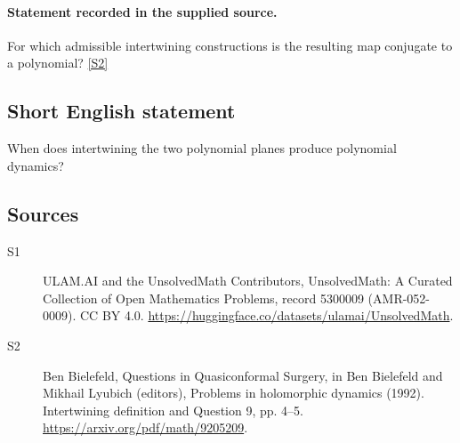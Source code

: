 \documentclass[11pt]{article}
\newcommand{\sref}[2]{\hyperlink{source:#1:#2}{[S#2]}}
\begin{document}
\paragraph{Statement recorded in the supplied source.}
For which admissible intertwining constructions is the resulting map conjugate to a polynomial? \sref{5300009}{2}
\subsection{Short English statement}
When does intertwining the two polynomial planes produce polynomial dynamics?
\subsection{Sources}
\begin{description}
\item[\hypertarget{source:5300009:1}{S1}] ULAM.AI and the UnsolvedMath Contributors, UnsolvedMath: A Curated Collection of Open Mathematics Problems, record 5300009 (AMR-052-0009). CC BY 4.0. \url{https://huggingface.co/datasets/ulamai/UnsolvedMath}.
\item[\hypertarget{source:5300009:2}{S2}] Ben Bielefeld, Questions in Quasiconformal Surgery, in Ben Bielefeld and Mikhail Lyubich (editors), Problems in holomorphic dynamics (1992). Intertwining definition and Question 9, pp. 4–5. \url{https://arxiv.org/pdf/math/9205209}.
\end{description}
\label{end:5300009}
\end{document}
